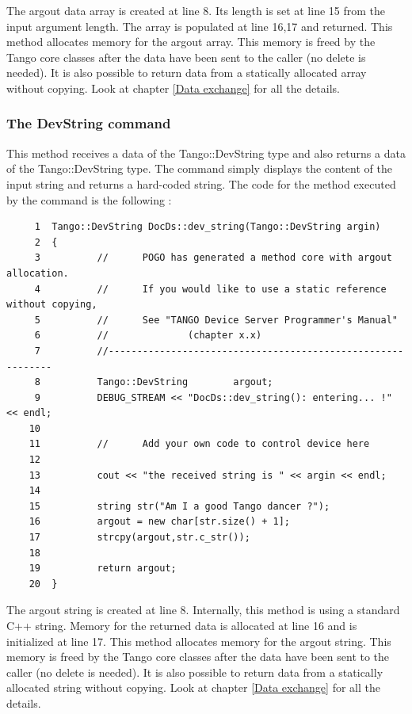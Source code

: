 The argout data array is created at line 8. Its length is set at line
15 from the input argument length. The array is populated at line
16,17 and returned. This method allocates memory for
the argout array. This memory is freed by the Tango core classes after
the data have been sent to the caller (no delete is needed). It is
also possible to return data from a statically allocated array without
copying. Look at chapter \ref{Data exchange} for all the details.


\subsubsection{The DevString command}

This method receives a data of the Tango::DevString
type and also returns a data of the Tango::DevString type. The command
simply displays the content of the input string and returns a hard-coded
string. The code for the method executed by the command is the following
:


\begin{verbatim}
     1  Tango::DevString DocDs::dev_string(Tango::DevString argin)
     2  {
     3          //      POGO has generated a method core with argout allocation.
     4          //      If you would like to use a static reference without copying,
     5          //      See "TANGO Device Server Programmer's Manual"
     6          //              (chapter x.x)
     7          //------------------------------------------------------------
     8          Tango::DevString        argout;
     9          DEBUG_STREAM << "DocDs::dev_string(): entering... !" << endl;
    10  
    11          //      Add your own code to control device here
    12  
    13          cout << "the received string is " << argin << endl;
    14          
    15          string str("Am I a good Tango dancer ?");
    16          argout = new char[str.size() + 1];
    17          strcpy(argout,str.c_str());
    18          
    19          return argout;
    20  }
\end{verbatim}


The argout string is created at line 8. Internally, this method is
using a standard C++ string. Memory for the returned data is allocated
at line 16 and is initialized at line 17. This method allocates memory
for the argout string. This memory is freed by the Tango core classes
after the data have been sent to the caller (no delete is needed).
It is also possible to return data from a statically allocated string
without copying. Look at chapter \ref{Data exchange} for all the
details.


